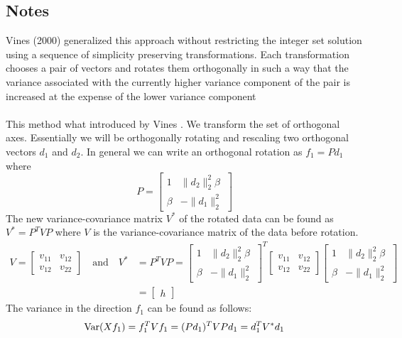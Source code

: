 \documentclass[10pt,letterpaper]{article}
\begin{document}
\subsection*{Notes}
Vines (2000) generalized this approach without restricting the integer set solution using a sequence of simplicity preserving transformations. Each transformation chooses a pair of vectors and rotates them orthogonally in such a way that the variance associated with the currently higher variance component of the pair is increased at the expense of the lower variance component
\\\\
This method what introduced by Vines \citeyear{Vines2000}. We transform the set of orthogonal axes. Essentially we will be orthogonally rotating and rescaling two orthogonal vectors $d_1$ and $d_2$. In general we can write an orthogonal rotation as $f_1 = Pd_1$ where
\begin{equation}
P=\begin{bmatrix}
1 & \|d_2\|_2^2 \beta\\\beta & -\|d_1\|_2^2
\end{bmatrix}
\end{equation}
The new variance-covariance matrix $V^*$ of the rotated data can be found as $V^*=P^TVP$ where $V$ is the variance-covariance matrix of the data before rotation. 
\begin{align*}
V=\begin{bmatrix}
v_{11} & v_{12}\\v_{12} & v_{22}
\end{bmatrix}\quad \text{and}\quad V^* &= P^TVP=\begin{bmatrix}
1 & \|d_2\|_2^2 \beta\\\beta & -\|d_1\|_2^2
\end{bmatrix}^T\begin{bmatrix}
v_{11} & v_{12}\\v_{12} & v_{22}
\end{bmatrix}\begin{bmatrix}
1 & \|d_2\|_2^2 \beta\\\beta & -\|d_1\|_2^2
\end{bmatrix}\\
&= \begin{bmatrix}
h
\end{bmatrix}
\end{align*}
The variance in the direction $f_1$ can be found as follows:
\begin{equation}
{{\rm Var}}(Xf_1)=f_1^TVf_1=(Pd_1)^TVPd_1=d_1^TV^*d_1
\end{equation}

\pagebreak


\end{document}

